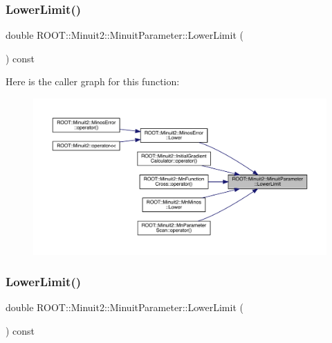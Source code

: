 \mbox{\label{classROOT_1_1Minuit2_1_1MinuitParameter_a25c7f30fc42264f1df96a3852d2e11a4}} 
\subsubsection{\texorpdfstring{LowerLimit()}{LowerLimit()}\hspace{0.1cm}{\footnotesize\ttfamily [1/3]}}
{\footnotesize\ttfamily double R\+O\+O\+T\+::\+Minuit2\+::\+Minuit\+Parameter\+::\+Lower\+Limit (\begin{DoxyParamCaption}{ }\end{DoxyParamCaption}) const\hspace{0.3cm}{\ttfamily [inline]}}

Here is the caller graph for this function\+:
\nopagebreak
\begin{figure}[H]
\begin{center}
\leavevmode
\includegraphics[width=350pt]{dd/dfb/classROOT_1_1Minuit2_1_1MinuitParameter_a25c7f30fc42264f1df96a3852d2e11a4_icgraph}
\end{center}
\end{figure}
\mbox{\label{classROOT_1_1Minuit2_1_1MinuitParameter_a25c7f30fc42264f1df96a3852d2e11a4}} 
\subsubsection{\texorpdfstring{LowerLimit()}{LowerLimit()}\hspace{0.1cm}{\footnotesize\ttfamily [2/3]}}
{\footnotesize\ttfamily double R\+O\+O\+T\+::\+Minuit2\+::\+Minuit\+Parameter\+::\+Lower\+Limit (\begin{DoxyParamCaption}{ }\end{DoxyParamCaption}) const\hspace{0.3cm}{\ttfamily [inline]}}

